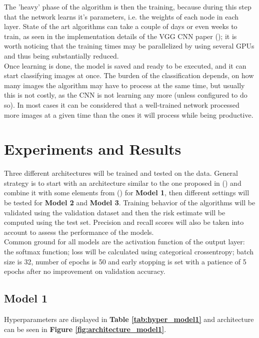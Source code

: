 \documentclass[11pt]{article}
\begin{document}
The 'heavy' phase of the algorithm is then the training, because during this step that the network learns it's parameters, i.e. the weights of each node in each layer. State of the art algorithms can take a couple of days or even weeks to train, as seen in the implementation details of the VGG CNN paper (\cite{simonyan2014very}); it is worth noticing that the training times may be parallelized by using several GPUs and thus being substantially reduced.\\ 

Once learning is done, the model is saved and ready to be executed, and it can start classifying images at once. The burden of the classification depends, on how many images the algorithm may have to process at the same time, but usually this is not costly, as the CNN is not learning any more (unless configured to do so). In most cases it can be considered that a well-trained network processed more images at a given time than the ones it will process while being productive.\\

\section{Experiments and Results} \label{Section4}

Three different architectures will be trained and tested on the data. General strategy is to start with an architecture similar to the one proposed in (\cite{wu2021leaf}) and combine it with some elements from  (\cite{simonyan2014very}) for \textbf{Model 1}, then different settings will be tested for \textbf{Model 2} and \textbf{Model 3}. Training behavior of the algorithms will be validated using the validation dataset and then the risk estimate will be computed using the test set. Precision and recall scores will also be taken into account to assess the performance of the models.\\

Common ground for all models are the activation function of the output layer: the softmax function; loss will be calculated using categorical crossentropy; batch size is 32, number of epochs is 50 and early stopping is set with a patience of 5 epochs after no improvement on validation accuracy.\\

\subsection{Model 1}
Hyperparameters are displayed in \textbf{Table \ref{tab:hyper_model1}} and architecture can be seen in \textbf{Figure \ref{fig:architecture_model1}}. \\
\end{document}
